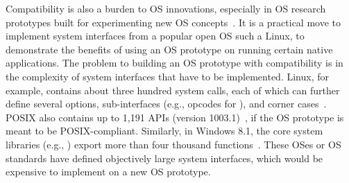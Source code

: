Compatibility is also a burden to OS innovations, especially in OS research prototypes
built for experimenting new OS concepts~\cite{baumann09barrelfish,unikernels,zeldovich+histar,libra,peter14arrakis,belay14ix}.
It is a practical move to implement system interfaces from a popular open OS such a Linux,
to demonstrate the benefits of using an OS prototype
on running certain native applications.
The problem to building an OS prototype with compatibility is in the complexity
of system interfaces that have to be implemented.
Linux, for example,
contains about three hundred system calls,
each of which 
can further define several options, sub-interfaces (e.g., opcodes for ), and corner cases~\cite{linux-man-syscall}.
POSIX also contains up to 1,191 APIs (version 1003.1)~\cite{ieee-posix}, if the OS prototype is meant to be POSIX-compliant. %
Similarly, in Windows 8.1, the core system libraries (e.g., ) export more than four thousand functions~\cite{win-api}.
These OSes or OS standards have defined objectively large system interfaces, which would be
expensive to implement on
 a new OS prototype.




